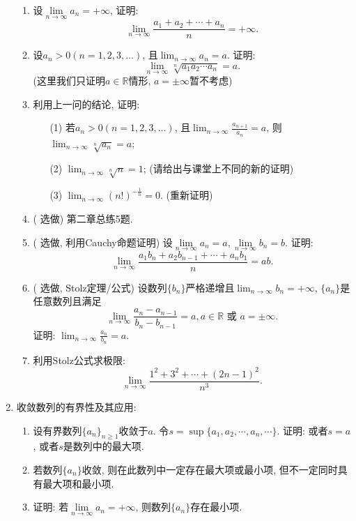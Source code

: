 \documentclass[UTF8,11pt, a4paper, oneside, fontset=none]{ctexbook}
\begin{document}
\begin{enumerate}
\begin{enumerate}
\item 设$\lim\limits_{n \to \infty}a_n = +\infty $, 证明:
\[
\lim_{n \to \infty} \frac{a_1 + a_2 + \cdots + a_n}{n} = +\infty.
\]
\item 设$a_n>0 (n = 1, 2, 3, \ldots)$, 且$\lim_{n \to \infty} a_n =a$. 证明:
\[
\lim_{n \to \infty} \sqrt[n]{a_1 a_2 \cdots a_n} = a.
\]
(这里我们只证明$a \in \mathbb R$情形, $a = \pm \infty$暂不考虑)

\item 利用上一问的结论, 证明:
\begin{itemize}
\item[(1)] 若$a_n>0 (n = 1, 2, 3, \ldots)$, 且$\lim_{n \to \infty}\frac{a_{n+1}}{a_n} =a$, 则$\lim_{n \to \infty} \sqrt[n]{a_n} =a$;
\item[(2)] $\lim_{n \to \infty} \sqrt[n]{n} =1$; (请给出与课堂上不同的新的证明)
\item[(3)] $\lim_{n \to \infty} (n!)^{-\frac{1}{n}} =0$. (重新证明)
\end{itemize} 

\item ({\color{red} 选做}) 第二章总练5题.

\item ({\color{red} 选做, 利用Cauchy命题证明}) 设$\lim\limits_{n \to \infty} a_n =a, \lim\limits_{n \to \infty} b_n =b$. 证明:
\[
\lim_{n \to \infty} \frac{a_1 b_n + a_2 b_{n-1} + \cdots + a_n b_1}{n} = ab. 
\]

\item ({\color{red} 选做, Stolz定理/公式}) 设数列$\{ b_n \}$严格递增且$\lim_{n \to \infty} b_n = +\infty$, $\{ a_n \}$是任意数列且满足
\[
\lim_{n \to \infty} \frac{a_n - a_{n-1}}{b_n - b_{n-1}} = a, a \in \mathbb R \mbox{ 或 \ } a = \pm \infty.
\]
证明: $\lim_{n \to \infty} \frac{a_n}{b_n} = a$.

\item 利用Stolz公式求极限: 
\[
\lim_{n \to \infty} \frac{1^2 + 3^2 + \cdots + (2n-1)^2}{n^3}.
\]

\end{enumerate}

\item 收敛数列的有界性及其应用:

\begin{enumerate}
\item 设有界数列$\{ a_n \}_{n \geq 1}$收敛于$a$. 令$s = \sup \{a_1, a_2, \cdots, a_n, \cdots \}$. 证明: 或者$s = a$, 或者$s$是数列中的最大项.

\item 若数列$\{a_n\}$收敛, 则在此数列中一定存在最大项或最小项, 但不一定同时具有最大项和最小项.
\item 证明: 若$\lim\limits_{n \to \infty} a_n = +\infty$, 则数列$\{a_n\}$存在最小项.
\end{enumerate}


\end{enumerate}
\end{document}
